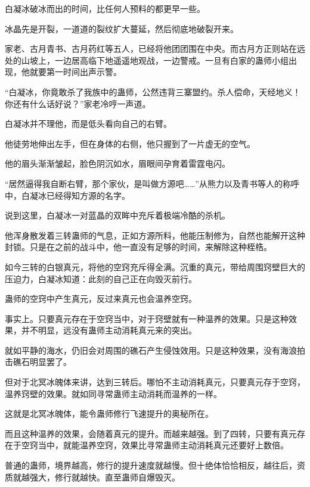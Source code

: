 
\begin{this_body}

白凝冰破冰而出的时间，比任何人预料的都更早一些。

冰晶先是开裂，一道道的裂纹扩大蔓延，然后彻底地破裂开来。

家老、古月青书、古月药红等五人，已经将他团团围在中央。而古月方正则站在远处的山坡上，一边居高临下地遥遥地观战，一边警戒。一旦有白家的蛊师小组出现，他就要第一时间出声示警。

“白凝冰，你竟敢杀了我族中的蛊师，公然违背三寨盟约。杀人偿命，天经地义！你还有什么话好说？”家老冷哼一声道。

白凝冰并不理他，而是低头看向自己的右臂。

他徒劳地伸出左手，但在身体的右侧，他只握到了一片虚无的空气。

他的眉头渐渐皱起，脸色阴沉如水，眉眼间孕育着雷霆电闪。

“居然逼得我自断右臂，那个家伙，是叫做方源吧……”从熊力以及青书等人的称呼中，白凝冰已经得知方源的名字。

说到这里，白凝冰一对蓝晶的双眸中充斥着极端冷酷的杀机。

他浑身散发着三转蛊师的气息，正如方源所料，他能压制修为，自然也能解开这种封锁。只是在之前的战斗中，他一直没有足够的时间，来解除这种桎梏。

如今三转的白银真元，将他的空窍充斥得全满。沉重的真元，带给周围窍壁巨大的压迫力，白凝冰知道：此刻的自己正在向毁灭前行。

蛊师的空窍中产生真元，反过来真元也会温养空窍。

事实上。只要真元存在于空窍当中，对于窍壁就有一种温养的效果。只是这种效果，并不明显，远没有蛊师主动消耗真元来的突出。

就如平静的海水，仍旧会对周围的礁石产生侵蚀效用。只是这种效果，没有海浪拍击礁石明显罢了。

但对于北冥冰魄体来讲，达到三转后。哪怕不主动消耗真元，只要真元存于空窍，温养窍壁的效果。就如同寻常蛊师主动消耗而温养的一样。

这就是北冥冰魄体，能令蛊师修行飞速提升的奥秘所在。

而且这种温养的效果，会随着真元的提升。而越来越强。到了四转，只要有真元存在于空窍当中，就能温养空窍，效果比寻常蛊师主动消耗真元还要好上数倍。

普通的蛊师，境界越高，修行的提升速度就越慢。但十绝体恰恰相反，越往后，资质就越强大，修行就越快。直至蛊师自爆毁灭。


\end{this_body}
